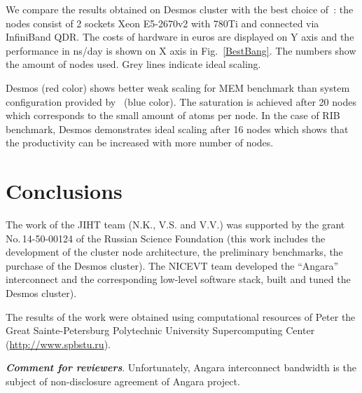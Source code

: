 \documentclass{llncs}
\begin{document}
We compare the results obtained on Desmos cluster with the best choice of~\cite{Kutzner2015}: the nodes consist of 2 sockets Xeon E5-2670v2 with 780Ti and connected via InfiniBand QDR. The costs of hardware in euros are displayed on Y axis and the performance in ns/day is shown on X axis in Fig.~\ref{BestBang}. The numbers show the amount of nodes used. Grey lines indicate ideal scaling.

Desmos (red color) shows better weak scaling for MEM benchmark than system configuration provided by~\cite{Kutzner2015} (blue color). The saturation is achieved after 20 nodes which corresponds to the small amount of atoms per node. In the case of RIB benchmark, Desmos demonstrates ideal scaling after 16 nodes which shows that the productivity can be increased with more number of nodes.


\section{Conclusions}

The work of the JIHT team (N.K., V.S. and V.V.) was supported by the grant No.\,14-50-00124 of the Russian Science Foundation (this work includes the development of the cluster node architecture, the preliminary benchmarks, the purchase of the Desmos cluster). The NICEVT team developed the ``Angara'' interconnect and the corresponding low-level software stack, built and tuned the Desmos cluster).

The results of the work were obtained using computational resources of Peter the Great Sainte-Petersburg Polytechnic University Supercomputing Center (\url{http://www.spbstu.ru}).

\textbf{\textit{Comment for reviewers}}. Unfortunately, Angara interconnect bandwidth is the subject of non-disclosure agreement of Angara project.




\end{document}
